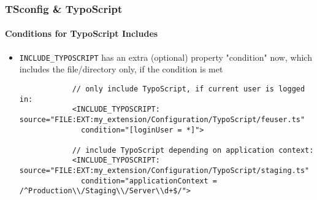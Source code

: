 \begin{frame}[fragile]
	\frametitle{TSconfig \& TypoScript}
	\framesubtitle{Conditions for TypoScript Includes}

	\lstset{basicstyle=\tiny\ttfamily}

	\begin{itemize}

		\item \texttt{INCLUDE\_TYPOSCRIPT} has an extra (optional) property "condition" now, which
			includes the file/directory only, if the condition is met

		\begin{lstlisting}
			// only include TypoScript, if current user is logged in:
			<INCLUDE_TYPOSCRIPT: source="FILE:EXT:my_extension/Configuration/TypoScript/feuser.ts"
			  condition="[loginUser = *]">

			// include TypoScript depending on application context:
			<INCLUDE_TYPOSCRIPT: source="FILE:EXT:my_extension/Configuration/TypoScript/staging.ts"
			  condition="applicationContext = /^Production\\/Staging\\/Server\\d+$/">
		\end{lstlisting}

	\end{itemize}

\end{frame}

